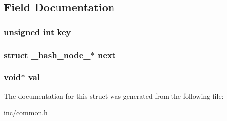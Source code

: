 \subsection{Field Documentation}
\hypertarget{struct__hash__node___a668a437ea5e7a51173aee9f82f6747de}{
\subsubsection[{key}]{\setlength{\rightskip}{0pt plus 5cm}unsigned int key}}\label{struct__hash__node___a668a437ea5e7a51173aee9f82f6747de}
\hypertarget{struct__hash__node___a5805097a777732cd94d182bab6c7feb2}{
\subsubsection[{next}]{\setlength{\rightskip}{0pt plus 5cm}struct {\bf \-\_\-hash\-\_\-node\-\_\-}$\ast$ next}}\label{struct__hash__node___a5805097a777732cd94d182bab6c7feb2}
\hypertarget{struct__hash__node___ab03f36f103bdec81305fd301f1f93885}{
\subsubsection[{val}]{\setlength{\rightskip}{0pt plus 5cm}void$\ast$ val}}\label{struct__hash__node___ab03f36f103bdec81305fd301f1f93885}


The documentation for this struct was generated from the following file\-:\begin{DoxyCompactItemize}
\item 
inc/\hyperlink{common_8h}{common.\-h}\end{DoxyCompactItemize}
